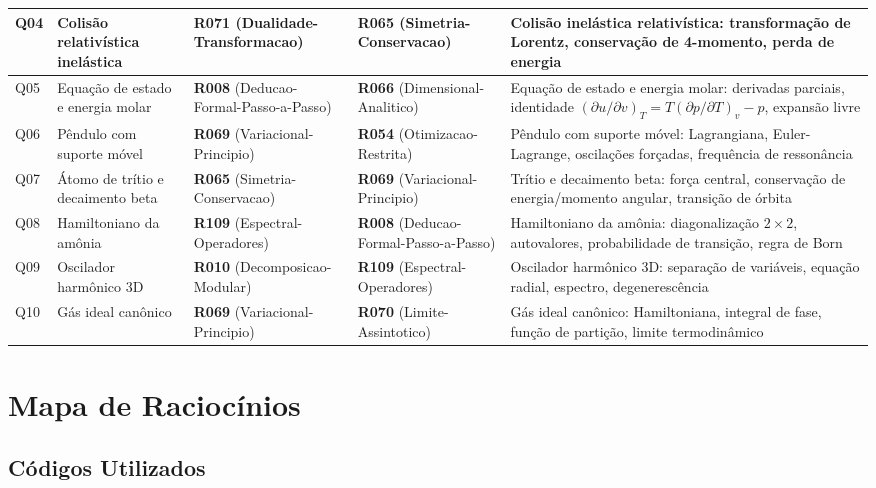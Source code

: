 \documentclass[12pt,a4paper]{article}
\newcommand{\rcode}[1]{\textcolor{azulprof}{\textbf{#1}}}
\begin{document}
\begin{longtable}{@{}p{1.5cm}p{2.8cm}p{2.5cm}p{2.5cm}p{5.2cm}@{}}
Q04 & Colisão relativística inelástica
  & \rcode{R071} (Dualidade-Transformacao)
  & \rcode{R065} (Simetria-Conservacao)
  & Colisão inelástica relativística: transformação de
    Lorentz, conservação de 4-momento, perda de energia \\
\midrule

Q05 & Equação de estado e energia molar
  & \rcode{R008} (Deducao-Formal-Passo-a-Passo)
  & \rcode{R066} (Dimensional-Analitico)
  & Equação de estado e energia molar: derivadas parciais,
    identidade $(\partial u/\partial v)_T = T(\partial p/\partial T)_v - p$,
    expansão livre \\
\midrule

Q06 & Pêndulo com suporte móvel
  & \rcode{R069} (Variacional-Principio)
  & \rcode{R054} (Otimizacao-Restrita)
  & Pêndulo com suporte móvel: Lagrangiana, Euler-Lagrange,
    oscilações forçadas, frequência de ressonância \\
\midrule

Q07 & Átomo de trítio e decaimento beta
  & \rcode{R065} (Simetria-Conservacao)
  & \rcode{R069} (Variacional-Principio)
  & Trítio e decaimento beta: força central, conservação de
    energia/momento angular, transição de órbita \\
\midrule

Q08 & Hamiltoniano da amônia
  & \rcode{R109} (Espectral-Operadores)
  & \rcode{R008} (Deducao-Formal-Passo-a-Passo)
  & Hamiltoniano da amônia: diagonalização $2\times2$,
    autovalores, probabilidade de transição, regra de Born \\
\midrule

Q09 & Oscilador harmônico 3D
  & \rcode{R010} (Decomposicao-Modular)
  & \rcode{R109} (Espectral-Operadores)
  & Oscilador harmônico 3D: separação de variáveis,
    equação radial, espectro, degenerescência \\
\midrule

Q10 & Gás ideal canônico
  & \rcode{R069} (Variacional-Principio)
  & \rcode{R070} (Limite-Assintotico)
  & Gás ideal canônico: Hamiltoniana, integral de fase,
    função de partição, limite termodinâmico \\
\bottomrule
\end{longtable}

\newpage
\section{Mapa de Raciocínios}

\subsection{Códigos Utilizados}
\end{document}
